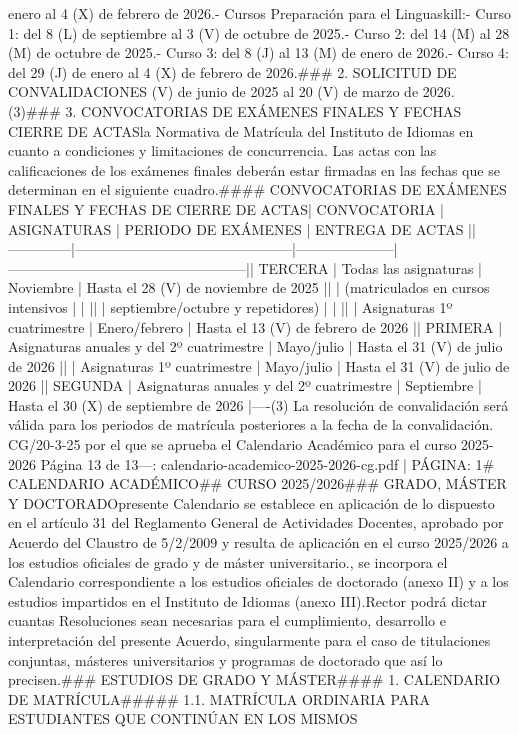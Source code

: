 \documentclass{article}
\begin{document}
\begin{itemize}
{enero al 4 (X) de febrero de 2026.\n- Cursos Preparación para el Linguaskill:\n- Curso 1: del 8 (L) de septiembre al 3 (V) de octubre de 2025.\n- Curso 2: del 14 (M) al 28 (M) de octubre de 2025.\n- Curso 3: del 8 (J) al 13 (M) de enero de 2026.\n- Curso 4: del 29 (J) de enero al 4 (X) de febrero de 2026.\n\n### 2. SOLICITUD DE CONVALIDACIONES\n{} (V) de junio de 2025 al 20 (V) de marzo de 2026. (3)\n\n### 3. CONVOCATORIAS DE EXÁMENES FINALES Y FECHAS CIERRE DE ACTAS\n{} la Normativa de Matrícula del Instituto de Idiomas en cuanto a condiciones y limitaciones de concurrencia. Las actas con las calificaciones de los exámenes finales deberán estar firmadas en las fechas que se determinan en el siguiente cuadro.\n\n#### CONVOCATORIAS DE EXÁMENES FINALES Y FECHAS DE CIERRE DE ACTAS\n\n| CONVOCATORIA | ASIGNATURAS                                   | PERIODO DE EXÁMENES | ENTREGA DE ACTAS                                   |\n|--------------|-----------------------------------------------|---------------------|---------------------------------------------------|\n| TERCERA      | Todas las asignaturas                         | Noviembre           | Hasta el 28 (V) de noviembre de 2025              |\n|              | (matriculados en cursos intensivos            |                     |                                                   |\n|              | septiembre/octubre y repetidores)            |                     |                                                   |\n|              | Asignaturas 1º cuatrimestre                  | Enero/febrero       | Hasta el 13 (V) de febrero de 2026                |\n| PRIMERA      | Asignaturas anuales y del 2º cuatrimestre    | Mayo/julio          | Hasta el 31 (V) de julio de 2026                  |\n|              | Asignaturas 1º cuatrimestre                  | Mayo/julio          | Hasta el 31 (V) de julio de 2026                  |\n| SEGUNDA      | Asignaturas anuales y del 2º cuatrimestre    | Septiembre          | Hasta el 30 (X) de septiembre de 2026             |\n\n----\n(3) La resolución de convalidación será válida para los periodos de matrícula posteriores a la fecha de la convalidación.\n{} CG/20-3-25 por el que se aprueba el Calendario Académico para el curso 2025-2026      Página 13 de 13\n\n---\n\nFUENTE: calendario-academico-2025-2026-cg.pdf | PÁGINA: 1\n# CALENDARIO ACADÉMICO\n## CURSO 2025/2026\n\n### GRADO, MÁSTER Y DOCTORADO\n\nEl presente Calendario se establece en aplicación de lo dispuesto en el artículo 31 del Reglamento General de Actividades Docentes, aprobado por Acuerdo del Claustro de 5/2/2009 y resulta de aplicación en el curso 2025/2026 a los estudios oficiales de grado y de máster universitario.\n\nAsimismo, se incorpora el Calendario correspondiente a los estudios oficiales de doctorado (anexo II) y a los estudios impartidos en el Instituto de Idiomas (anexo III).\n\nEl Rector podrá dictar cuantas Resoluciones sean necesarias para el cumplimiento, desarrollo e interpretación del presente Acuerdo, singularmente para el caso de titulaciones conjuntas, másteres universitarios y programas de doctorado que así lo precisen.\n\n### ESTUDIOS DE GRADO Y MÁSTER\n\n#### 1. CALENDARIO DE MATRÍCULA\n\n##### 1.1. MATRÍCULA ORDINARIA PARA ESTUDIANTES QUE CONTINÚAN EN LOS MISMOS }
\end{itemize}
\end{document}
